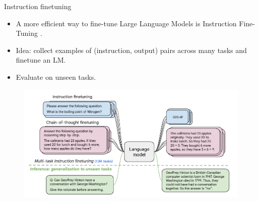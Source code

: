 \documentclass[handout]{beamer}
\begin{document}
\begin{frame}{Instruction finetuning}

\begin{scriptsize}
\begin{itemize}
\item A more efficient way to fine-tune Large Language Models is Instruction Fine-Tuning  \cite{chung2022scaling}.
\item Idea: collect examples of (instruction, output) pairs across many tasks and finetune an LM.
\item Evaluate on unseen tasks.
\end{itemize}

\begin{figure}[h]
	\includegraphics[scale = 0.35]{pics/instructionfinetuning.png}
\end{figure}


\end{scriptsize}






\end{frame}
\end{document}
